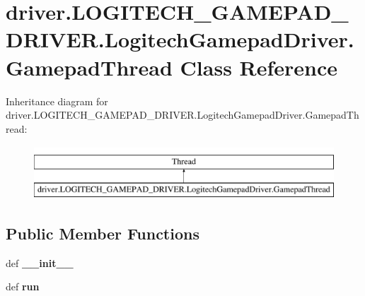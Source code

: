 \hypertarget{classdriver_1_1LOGITECH__GAMEPAD__DRIVER_1_1LogitechGamepadDriver_1_1GamepadThread}{}\section{driver.\+L\+O\+G\+I\+T\+E\+C\+H\+\_\+\+G\+A\+M\+E\+P\+A\+D\+\_\+\+D\+R\+I\+V\+E\+R.\+Logitech\+Gamepad\+Driver.\+Gamepad\+Thread Class Reference}
\label{classdriver_1_1LOGITECH__GAMEPAD__DRIVER_1_1LogitechGamepadDriver_1_1GamepadThread}
Inheritance diagram for driver.\+L\+O\+G\+I\+T\+E\+C\+H\+\_\+\+G\+A\+M\+E\+P\+A\+D\+\_\+\+D\+R\+I\+V\+E\+R.\+Logitech\+Gamepad\+Driver.\+Gamepad\+Thread\+:\begin{figure}[H]
\begin{center}
\leavevmode
\includegraphics[height=2.000000cm]{classdriver_1_1LOGITECH__GAMEPAD__DRIVER_1_1LogitechGamepadDriver_1_1GamepadThread}
\end{center}
\end{figure}
\subsection*{Public Member Functions}
\begin{DoxyCompactItemize}
\item 
\hypertarget{classdriver_1_1LOGITECH__GAMEPAD__DRIVER_1_1LogitechGamepadDriver_1_1GamepadThread_aa08ed3fd5770b7518dd3c3672adb37d3}{}def {\bfseries \+\_\+\+\_\+init\+\_\+\+\_\+}\label{classdriver_1_1LOGITECH__GAMEPAD__DRIVER_1_1LogitechGamepadDriver_1_1GamepadThread_aa08ed3fd5770b7518dd3c3672adb37d3}

\item 
\hypertarget{classdriver_1_1LOGITECH__GAMEPAD__DRIVER_1_1LogitechGamepadDriver_1_1GamepadThread_a1081a12fcf001359ba0755676ef9db77}{}def {\bfseries run}\label{classdriver_1_1LOGITECH__GAMEPAD__DRIVER_1_1LogitechGamepadDriver_1_1GamepadThread_a1081a12fcf001359ba0755676ef9db77}

\end{DoxyCompactItemize}
